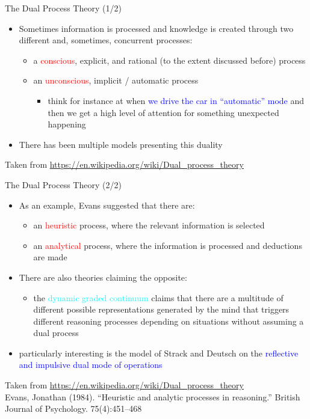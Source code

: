 \documentclass{beamer}
\begin{document}
\begin{frame}
{\centerline{The Dual Process Theory (1/2)}}
\begin{itemize}
    \item Sometimes information is processed and knowledge is created through two different and, sometimes, concurrent processes:
    \begin{itemize}
   \item a \textcolor{red}{conscious}, explicit, and rational (to the extent discussed before) process
   \item an \textcolor{red}{unconscious}, implicit / automatic process
       \begin{itemize}
   \item think for instance at when \textcolor{blue}{we drive the car in ``automatic'' mode} and then we get a high level of attention for something unexpected happening
   \end{itemize} 
      \end{itemize} 
         \item There has been multiple models presenting this duality
   \end{itemize} 
\begin{center}
    \tiny{Taken from \url{https://en.wikipedia.org/wiki/Dual_process_theory}}
\end{center}

\end{frame}

\begin{frame}
{\centerline{The Dual Process Theory (2/2)}}
\begin{itemize}
   \item As an example, Evans suggested that there are:
         \begin{itemize}
   \item an \textcolor{red}{heuristic} process, where the relevant information is selected
   \item an \textcolor{red}{analytical} process, where the information is processed and deductions are made
   \end{itemize}  
   \item There are also theories claiming the opposite:
   \begin{itemize}
   \item the \textcolor{cyan}{dynamic graded continuum} claims that there are a multitude of different possible representations generated by the mind that triggers different reasoning processes depending on situations without assuming a dual process
   \end{itemize}  
   \item particularly interesting is the model of Strack and Deutsch on the \textcolor{blue}{reflective and impulsive dual mode of operations}
   \end{itemize} 
\begin{center}
    \tiny{Taken from \url{https://en.wikipedia.org/wiki/Dual_process_theory}\\Evans, Jonathan (1984). ``Heuristic and analytic processes in reasoning.'' British Journal of Psychology. 75(4):451–468}
\end{center}

\end{frame}
\end{document}
